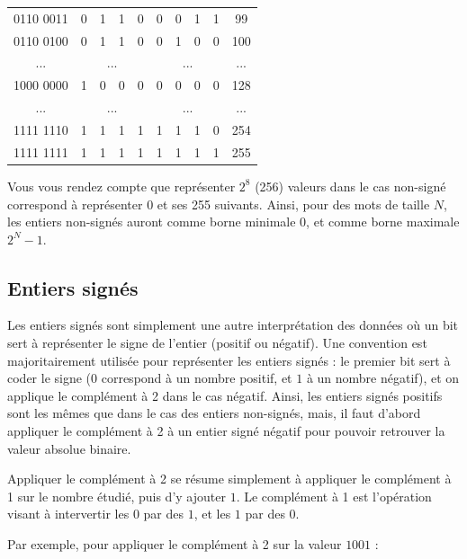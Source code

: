 \documentclass[11pt,a4paper]{article}
\begin{document}
\begin{center}
\begin{tabular}{ | c | c c c c | c c c c | c |}
0110 0011  &  0 & 1 & 1 & 0  &  0 & 0 & 1 & 1   & 99 \\
0110 0100  &  0 & 1 & 1 & 0  &  0 & 1 & 0 & 0   & 100 \\
... & \multicolumn{4}{|c|}{...} & \multicolumn{4}{c|}{...} & ... \\
1000 0000  &  1 & 0 & 0 & 0  &  0 & 0 & 0 & 0   & 128 \\
... & \multicolumn{4}{|c|}{...} & \multicolumn{4}{c|}{...} & ... \\
1111 1110  &  1 & 1 & 1 & 1  &  1 & 1 & 1 & 0   & 254 \\
1111 1111  &  1 & 1 & 1 & 1  &  1 & 1 & 1 & 1   & 255 \\
\hline
\end{tabular}
\end{center}

\bigskip

Vous vous rendez compte que représenter $ 2^8 $ (256) valeurs  dans le cas non-signé correspond à représenter $ 0 $ et ses 255 suivants.
Ainsi, pour des mots de taille $ N $, les entiers non-signés auront comme borne minimale $ 0 $, et comme borne maximale $ 2^N - 1 $.

\bigskip


\subsection{Entiers signés}

\medskip

Les entiers signés sont simplement une autre interprétation des données où un bit sert à représenter le signe de l'entier (positif ou négatif).
Une convention est majoritairement utilisée pour représenter les entiers signés : le premier bit sert à coder le signe ($ 0 $ correspond à un nombre positif, et $ 1 $ à un nombre négatif), et on applique le complément à 2 dans le cas négatif.
Ainsi, les entiers signés positifs sont les mêmes que dans le cas des entiers non-signés, mais, il faut d'abord appliquer le complément à 2 à un entier signé négatif pour pouvoir retrouver la valeur absolue binaire.

\bigskip

Appliquer le complément à 2 se résume simplement à appliquer le complément à 1 sur le nombre étudié, puis d'y ajouter $ 1 $.
Le complément à 1 est l'opération visant à intervertir les $ 0 $ par des $ 1 $, et les $ 1 $ par des $ 0 $.

Par exemple, pour appliquer le complément à 2 sur la valeur $ 1001 $ :
\end{document}
